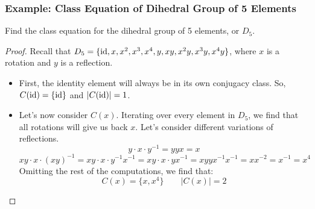 \documentclass[letterpaper]{article}
\begin{document}
\subsubsection{Example: Class Equation of Dihedral Group of 5 Elements}
Find the class equation for the dihedral group of 5 elements, or $D_5$. 

\begin{mdframed}
    \begin{proof}
        Recall that $D_5 = \{\operatorname{id}, x, x^2, x^3, x^4, y, xy, x^2 y, x^3 y, x^4 y\}$, where $x$ is a rotation and $y$ is a reflection. 
        \begin{itemize}
            \item First, the identity element will always be in its own conjugacy class. So, $C(\operatorname{id}) = \{\operatorname{id}\}$ and $|C(\operatorname{id})| = 1$. 
            
            \item Let's now consider $C(x)$. Iterating over every element in $D_5$, we find that all rotations will give us back $x$. Let's consider different variations of reflections.   
            \[y \cdot x \cdot y^{-1} = yyx = x\]
            \[xy \cdot x \cdot (xy)^{-1} = xy \cdot x \cdot y^{-1} x^{-1} = xy \cdot x \cdot y x^{-1} = xy y x^{-1} x^{-1} = x x^{-2} = x^{-1} = x^4\]
            Omitting the rest of the computations, we find that: 
            \[C(x) = \{x, x^4\} \qquad |C(x)| = 2\]
            

\end{itemize}
\end{proof}
\end{mdframed}
\end{document}
